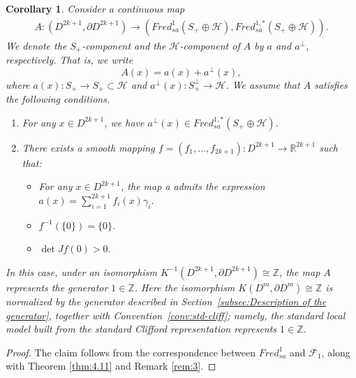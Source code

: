 \documentclass{amsart}
\newtheorem{cor}[thm]{Corollary}
\theoremstyle{definition}
\theoremstyle{remark}
\begin{document}
                               
\begin{cor}
Consider a continuous map
\begin{align*}
A \colon (D^{2k+1}, \partial D^{2k+1}) \to (Fred_{sa}^{1}(S_{+} \oplus \mathcal{H}), Fred_{sa}^{1,*}(S_{+} \oplus \mathcal{H})).
\end{align*}
We denote the \( S_{+} \)-component and the \( \mathcal{H} \)-component of \( A \) 
by \( a \) and \( a^{\perp} \), respectively. That is, we write
\[
A(x) = a(x) + a^{\perp}(x),
\]
where \( a(x) \colon S_{+} \to S_{+} \subset \mathcal{H} \) and 
\( a^{\perp}(x) \colon S_{+}^{\perp} \to \mathcal{H} \). We assume that $A$ satisfies the following conditions.
\begin{enumerate}
\item For any $x \in D^{2k+1}$, we have $a^{\perp}(x)\in Fred_{sa}^{1,*}(S_{+}\oplus \mathcal{H})$.\\
\item There exists a smooth mapping $f=(f_1,...,f_{2k+1})\colon D^{2k+1}\to \mathbb{R}^{2k+1}$ such that:
\begin{itemize}
    \item  For any $x \in D^{2k+1}$, the map a admits the expression $a(x)=\sum_{i=1}^{2k+1}f_i(x)\gamma_i$.
    \item $f^{-1}(\{0\})=\{0\}$.
    \item $\det Jf(0)>0$.
\end{itemize}
\end{enumerate}
In this case, under an isomorphism $K^{-1}(D^{2k+1},\partial D^{2k+1})\cong \mathbb{Z}$, the map $A$ represents the generator $1 \in \mathbb{Z}$. Here the isomorphism $K(D^{m},\partial D^{m})\cong \mathbb{Z}$ is normalized by the generator described in Section~\ref{subsec:Description of the generator}, together with Convention~\ref{conv:std-cliff}; namely, the standard local model built from the standard Clifford representation represents $1\in\mathbb{Z}$.
\end{cor}

\begin{proof}
The claim follows from the correspondence between $Fred_{sa}^{1}$ and $\mathcal{F}_1$, along with Theorem \ref{thm:4.11} and Remark \ref{rem:3}.
\end{proof}
                                                

                                                  

\end{document}
